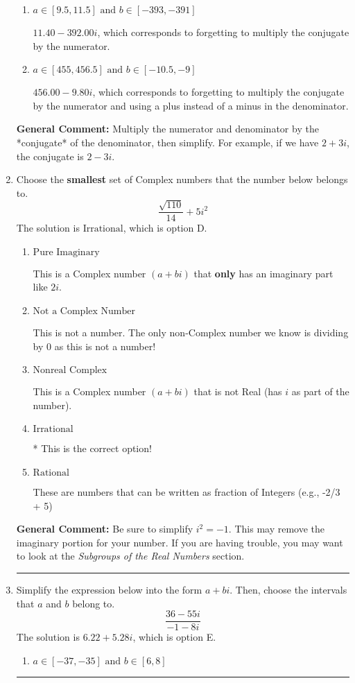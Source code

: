 \documentclass{extbook}[14pt]
\newcommand{\litem}[1]{\item #1

\rule{\textwidth}{0.4pt}}
\begin{document}
\begin{enumerate}
{\begin{enumerate}[label=\Alph*.]
 $-18.00  + 14.67 i$, which corresponds to just dividing the first term by the first term and the second by the second.
\item \( a \in [9.5, 11.5] \text{ and } b \in [-393, -391] \)

 $11.40  - 392.00 i$, which corresponds to forgetting to multiply the conjugate by the numerator.
\item \( a \in [455, 456.5] \text{ and } b \in [-10.5, -9] \)

 $456.00  - 9.80 i$, which corresponds to forgetting to multiply the conjugate by the numerator and using a plus instead of a minus in the denominator.
\end{enumerate}

\textbf{General Comment:} Multiply the numerator and denominator by the *conjugate* of the denominator, then simplify. For example, if we have $2+3i$, the conjugate is $2-3i$.
}
\litem{
Choose the \textbf{smallest} set of Complex numbers that the number below belongs to.
\[ \frac{\sqrt{110}}{14}+5i^2 \]The solution is \( \text{Irrational} \), which is option D.\begin{enumerate}[label=\Alph*.]
\item \( \text{Pure Imaginary} \)

This is a Complex number $(a+bi)$ that \textbf{only} has an imaginary part like $2i$.
\item \( \text{Not a Complex Number} \)

This is not a number. The only non-Complex number we know is dividing by 0 as this is not a number!
\item \( \text{Nonreal Complex} \)

This is a Complex number $(a+bi)$ that is not Real (has $i$ as part of the number).
\item \( \text{Irrational} \)

* This is the correct option!
\item \( \text{Rational} \)

These are numbers that can be written as fraction of Integers (e.g., -2/3 + 5)
\end{enumerate}

\textbf{General Comment:} Be sure to simplify $i^2 = -1$. This may remove the imaginary portion for your number. If you are having trouble, you may want to look at the \textit{Subgroups of the Real Numbers} section.
}
\litem{
Simplify the expression below into the form $a+bi$. Then, choose the intervals that $a$ and $b$ belong to.
\[ \frac{36 - 55 i}{-1 - 8 i} \]The solution is \( 6.22  + 5.28 i \), which is option E.\begin{enumerate}[label=\Alph*.]
\item \( a \in [-37, -35] \text{ and } b \in [6, 8] \)


\end{enumerate}}
\end{enumerate}
\end{document}
